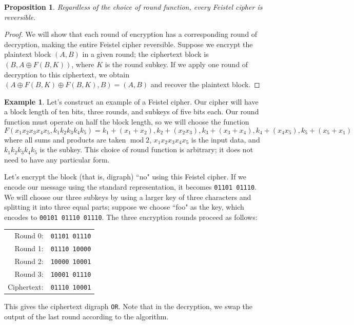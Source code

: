 \documentclass{book}
\theoremstyle{plain}
\newtheorem{proposition}[theorem]{Proposition}
\theoremstyle{definition}
\newtheorem{example}[theorem]{Example}
\newcommand{\ciphertext}[1]{\texttt{#1}} %
\renewcommand{\mod}{\operatorname{mod}}
\renewcommand{\mod}{\operatorname{mod}}
\begin{document}
\begin{proposition}
Regardless of the choice of round function, every Feistel cipher is reversible.
\end{proposition}

\begin{proof}
We will show that each round of encryption has a corresponding round of decryption, making the entire Feistel cipher reversible. Suppose we encrypt the plaintext block $(A,B)$ in a given round; the ciphertext block is $(B,A \oplus F(B,K))$, where $K$ is the round subkey. If we apply one round of decryption to this ciphertext, we obtain $(A \oplus F(B,K) \oplus F(B,K),B) = (A,B)$ and recover the plaintext block.
\end{proof}

\begin{example}
Let's construct an example of a Feistel cipher. Our cipher will have a block length of ten bits, three rounds, and subkeys of five bits each. Our round function must operate on half the block length, so we will choose the function $$F(x_1x_2x_3x_4x_5,k_1k_2k_3k_4k_5) = k_1 + (x_1 + x_2), k_2 + (x_2x_3), k_3 + (x_3 + x_4), k_4 + (x_4x_5), k_5 + (x_5 + x_1)$$ where all sums and products are taken $\mod 2$, $x_1x_2x_3x_4x_5$ is the input data, and $k_1k_2k_3k_4k_5$ is the subkey. This choice of round function is arbitrary; it does not need to have any particular form.

Let's encrypt the block (that is, digraph) ``no" using this Feistel cipher. If we encode our message using the standard representation, it becomes \ciphertext{01101 01110}. We will choose our three subkeys by using a larger key of three characters and splitting it into three equal parts; suppose we choose ``foo" as the key, which encodes to \ciphertext{00101 01110 01110}. The three encryption rounds proceed as follows:

\begin{center}
\begin{tabular}{rl}
Round 0: & \ciphertext{01101 01110} \\
Round 1: & \ciphertext{01110 10000} \\
Round 2: & \ciphertext{10000 10001} \\
Round 3: & \ciphertext{10001 01110} \\
Ciphertext: & \ciphertext{01110 10001}
\end{tabular}
\end{center}

This gives the ciphertext digraph \ciphertext{OR}. Note that in the decryption, we swap the output of the last round according to the algorithm.


\end{example}
\end{document}
